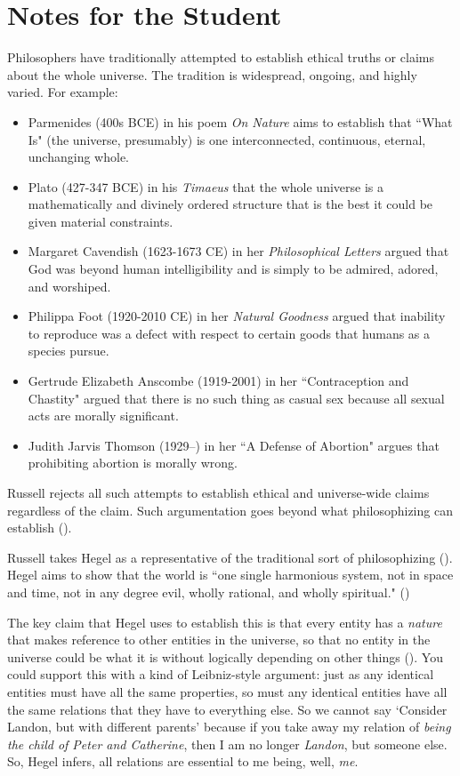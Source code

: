 \documentclass[oneside,letterpaper,12pt]{book}
\begin{document}
\protect\hypertarget{link2HCH0015}{}{}

\pagebreak
\section{Notes for the Student}
Philosophers have traditionally attempted to establish ethical truths or claims about the whole universe. The tradition is widespread, ongoing, and highly varied. For example:
\begin{itemize}
	\item Parmenides (400s BCE) in his poem \textit{On Nature} aims to establish that ``What Is" (the universe, presumably) is one interconnected, continuous, eternal, unchanging whole.
	\item Plato (427-347 BCE) in his \textit{Timaeus} that the whole universe is a mathematically and divinely ordered structure that is the best it could be given material constraints.
	\item Margaret Cavendish (1623-1673 CE) in her \textit{Philosophical Letters} argued that God was beyond human intelligibility and is simply to be admired, adored, and worshiped.
	\item Philippa Foot (1920-2010 CE) in her \textit{Natural Goodness} argued that inability to reproduce was a defect with respect to certain goods that humans as a species pursue.
	\item Gertrude Elizabeth Anscombe (1919-2001) in her ``Contraception and Chastity" argued that there is no such thing as casual sex because all sexual acts are morally significant.
	\item Judith Jarvis Thomson (1929--) in her ``A Defense of Abortion" argues that prohibiting abortion is morally wrong.
\end{itemize}
Russell rejects all such attempts to establish ethical and universe-wide claims regardless of the claim. Such argumentation goes beyond what philosophizing can establish (\pageref{vain}). 

Russell takes Hegel as a representative of the traditional sort of philosophizing (\pageref{hegel}). Hegel aims to show that the world is ``one single harmonious system, not in space and time, not in any degree evil, wholly rational, and wholly spiritual." (\pageref{harmonious})

The key claim that Hegel uses to establish this is that every entity has a \textit{nature} that makes reference to other entities in the universe, so that no entity in the universe could be what it is without logically depending on other things (\pageref{nature}). You could support this with a kind of Leibniz-style argument: just as any identical entities must have all the same properties, so must any identical entities have all the same relations that they have to everything else. So we cannot say `Consider Landon, but with different parents' because if you take away my relation of \textit{being the child of Peter and Catherine}, then I am no longer \textit{Landon}, but someone else. So, Hegel infers, all relations are essential to me being, well, \textit{me}.
\end{document}
